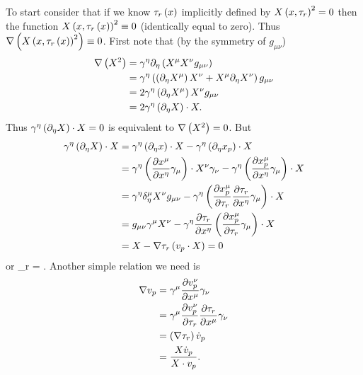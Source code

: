 To start consider that if we know ${\tau_{r}}\left ( {x} \right )$ implicitly defined by ${X}\left ( {x,\tau_{r}} \right )^{2} = 0$ then the function ${X}\left ( {x,{\tau_{r}}\left ( {x} \right )} \right )^{2} \equiv 0$ (identically
equal to zero). Thus $\nabla\left ( {{X}\left ( {x,{\tau_{r}}\left ( {x} \right )} \right )^{2}} \right ) \equiv 0$. First note that (by the symmetry of $g_{\mu\nu}$)
\begin{align}
	\nabla\left ( {X^{2}} \right ) &= \gamma^{\eta}\partial_{\eta}\left ( {X^{\mu}X^{\nu}g_{\mu\nu}} \right ) \nonumber \\
	                    &= \gamma^{\eta}\left ( {\left ( {\partial_{\eta}X^{\mu}} \right ) X^{\nu}+X^{\mu}\partial_{\eta}X^{\nu}} \right ) g_{\mu\nu} \nonumber \\
	                    &= 2\gamma^{\eta}\left ( {\partial_{\eta}X^{\mu}} \right ) X^{\nu}g_{\mu\nu} \nonumber \\
	                    &= 2\gamma^{\eta}\left ( {\partial_{\eta}X} \right )\cdot X. 
\end{align}
Thus $\gamma^{\eta}\left ( {\partial_{\eta}X} \right )\cdot X = 0$ is equivalent to $\nabla\left ( {X^{2}} \right )=0$. But
\begin{align}
	\gamma^{\eta}\left ( {\partial_{\eta}X} \right )\cdot X &= \gamma^{\eta}\left ( {\partial_{\eta}x} \right )\cdot X -\gamma^{\eta}\left ( {\partial_{\eta}x_{p}} \right )\cdot X  \nonumber \\
		                                         &= \gamma^{\eta}\left ( {\displaystyle\frac{\partial{x^{\mu}}}{\partial{x^{\eta}}}\gamma_{\mu}} \right )\cdot X^{\nu}\gamma_{\nu}
		                                           -\gamma^{\eta}\left ( {\displaystyle\frac{\partial{x_{p}^{\mu}}}{\partial{x^{\eta}}}\gamma_{\mu}} \right )\cdot X \nonumber \\
		                                         &= \gamma^{\eta}\delta_{\eta}^{\mu}X^{\nu}g_{\mu\nu}
		                                           -\gamma^{\eta}\left ( {\displaystyle\frac{\partial{x_{p}^{\mu}}}{\partial{\tau_{r}}}\displaystyle\frac{\partial{\tau_{r}}}{\partial{x^{\eta}}}\gamma_{\mu}} \right )\cdot X	\nonumber \\
		                                         &= g_{\mu\nu}\gamma^{\mu}X^{\nu}
		                                           -\gamma^{\eta}\displaystyle\frac{\partial{\tau_{r}}}{\partial{x^{\eta}}}\left ( {\displaystyle\frac{\partial{x_{p}^{\mu}}}{\partial{\tau_{r}}}\gamma_{\mu}} \right )\cdot X	\nonumber \\
		                                         &= X - \nabla\tau_{r}\left ( {v_{p}\cdot X} \right ) = 0		                                           	                                           
\end{align}
or
\be
	\nabla\tau_{r} = .
\ee
Another simple relation we need is
\begin{align}
	\nabla v_{p} &= \gamma^{\mu}\displaystyle\frac{\partial{v_{p}^{\nu}}}{\partial{x^{\mu}}}\gamma_{\nu} \nonumber \\
	         &= \gamma^{\mu}\displaystyle\frac{\partial{v_{p}^{\nu}}}{\partial{\tau_{r}}}\displaystyle\frac{\partial{\tau_{r}}}{\partial{x^{\mu}}}\gamma_{\nu} \nonumber \\
	         &= \left ( {\nabla\tau_{r}} \right )\dot{v}_{p} \nonumber \\
	         &= \displaystyle\frac{X\dot{v}_{p}}{X\cdot v_{p}}.
\end{align}
